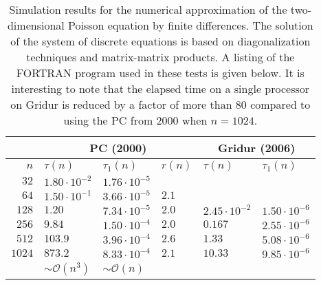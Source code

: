 \begin{table}
  \caption{
    Simulation results for the numerical approximation of the two-dimensional
    Poisson equation by finite differences. The solution of the system of
    discrete equations is based on diagonalization techniques and matrix-matrix
    products. A listing of the FORTRAN program used in these tests is given
    below. It is interesting to note that the elapsed time on a single processor
    on Gridur is reduced by a factor of more than 80 compared to using the PC
    from 2000 when $n=1024$.
  }
  \label{tbl:numres-diag}
  \begin{center}
    \bgroup{}
    \begin{tabular}{r|lll|ll}
      \hline
      \multicolumn{1}{r}{}
      & \multicolumn{3}{|c|}{PC (2000)}
      & \multicolumn{2}{c}{Gridur (2006)} \\
      \hline
      $n$ & $\tau(n)$ & $\tau_1(n)$ & $r(n)$ & $\tau(n)$ & $\tau_1(n)$ \\
      \hhline{======}
      $32$ & $1.80 \cdot 10^{-2}$ & $1.76 \cdot 10^{-5}$ & & &\\
      $64$ & $1.50 \cdot 10^{-1}$ & $3.66 \cdot 10^{-5}$ & $2.1$ & & \\
      $128$ & $1.20$ & $7.34 \cdot 10^{-5}$ & $2.0$ & $2.45 \cdot 10^{-2}$ & $1.50 \cdot 10^{-6}$ \\
      $256$ & $9.84$ & $1.50 \cdot 10^{-4}$ & $2.0$ & $0.167$ & $2.55 \cdot 10^{-6}$ \\
      $512$ & $103.9$ & $3.96 \cdot 10^{-4}$ & $2.6$ & $1.33$ & $5.08 \cdot 10^{-6}$ \\
      $1024$ & $873.2$ & $8.33 \cdot 10^{-4}$ & $2.1$ & $10.33$ & $9.85 \cdot 10^{-6}$ \\
      \hline
      & $\sim \mathcal{O}(n^3)$ & $\sim \mathcal{O}(n)$ & & & \\
      \hline
    \end{tabular}
    \egroup
  \end{center}
\end{table}

